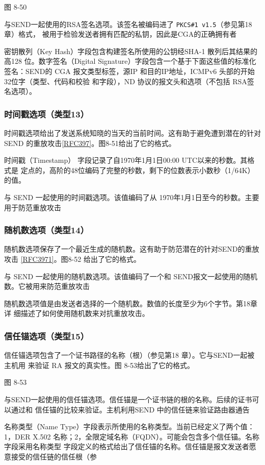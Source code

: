 图 8-50

与SEND一起使用的RSA签名选项。该签名被编码进了 \verb|PKCS#1 v1.5|（参见第18章）格式，
被用于检验发送者拥有匹配的私钥，因此是CGA的正确拥有者

密钥散列（Key Hash）字段包含构建签名所使用的公钥经SHA-1 散列后其结果的高128
位。数字签名（Digital Signature）字段包含一个基于下面这些值的标准化签名：SEND的
CGA 报文类型标签，源IP 和目的IP地址，ICMPv6 头部的开始32位字（类型、代码和校验
和字段），ND 协议的报文头和选项（不包括 RSA签名选项）。

\subsubsection{时间戳选项（类型13）}
时间戳选项给出了发送系统知晓的当天的当前时间。这有助于避免遭到潜在的针对
SEND 的重放攻击\href{https://www.rfc-editor.org/rfc/rfc397}{[RFC397]}。图8-51给出了它的格式。

时间戳（Timestamp） 字段记录了自1970年1月1日00:00 UTC以来的秒数。其格式是
定点的，高阶的48位编码了完整的秒数，剩下的位数表示小数秒（1/64K）的值。

与 SEND 一起使用的时间戳选项。该值编码了从 1970年1月1日至今的秒数。主要用于防范重放攻击

\subsubsection{随机数选项（类型14）}
随机数选项保存了一个最近生成的随机数。这有助于防范潜在的针对SEND的重放攻击
\href{https://www.rfc-editor.org/rfc/rfc3971}{[RFC3971]}。图8-52 给出了它的格式。

与 SEND 一起使用的随机数选项。该值编码了一个和 SEND报文一起使用的随机数。它被用来防范重放攻击

随机数选项值是由发送者选择的一个随机数。数值的长度至少为6个字节。第18章详
细描述了如何使用随机数来对抗重放攻击。

\subsubsection{信任锚选项（类型15）}
信任锚选项包含了一个证书路径的名称（根）（参见第18 章）。它与SEND一起被主机用
来验证 RA 报文的真实性。图 8-53给出了它的格式。

图 8-53

与SEND一起使用的信任锚选项。信任锚是一个证书链的根的名称。后续的证书可以通过和
信任锚的比较来验证。主机利用SEND 中的信任链来验证路由器通告

名称类型（Name Type）字段表示所使用的名称类型。当前已经定义了两个值：1，DER
X.502 名称；2，全限定域名称（FQDN）。可能会包含多个信任锚。名称字段采用名称类型
字段定义的格式给出了信任锚的名称。信任锚是报文发送者愿意接受的信任链的信任根（参
